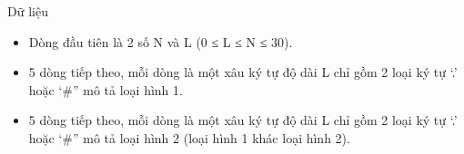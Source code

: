 Dữ liệu
\begin{itemize}
	\item     Dòng đầu tiên là 2 số N và L (0 ≤ L ≤ N ≤ 30).   
	\item     5 dòng tiếp theo, mỗi dòng là một xâu ký tự độ dài L chỉ gồm 2 loại ký tự ‘.’ hoặc ‘\#” mô tả loại hình 1.   
	\item     5 dòng tiếp theo, mỗi dòng là một xâu ký tự độ dài L chỉ gồm 2 loại ký tự ‘.’ hoặc ‘\#” mô tả loại hình 2 (loại hình 1 khác loại hình 2).   
\end{itemize}